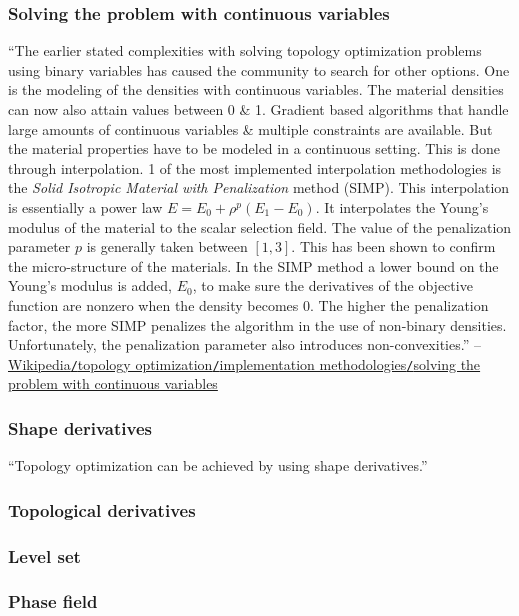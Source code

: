 \documentclass[oneside]{book}
\numberwithin{equation}{section}
\begin{document}
\subsubsection{Solving the problem with continuous variables}
``The earlier stated complexities with solving topology optimization problems using binary variables has caused the community to search for other options. One is the modeling of the densities with continuous variables. The material densities can now also attain values between 0 \& 1. Gradient based algorithms that handle large amounts of continuous variables \& multiple constraints are available. But the material properties have to be modeled in a continuous setting. This is done through interpolation. 1 of the most implemented interpolation methodologies is the \textit{Solid Isotropic Material with Penalization} method (SIMP). This interpolation is essentially a power law $E = E_0 + \rho^p(E_1 - E_0)$. It interpolates the Young's modulus of the material to the scalar selection field. The value of the penalization parameter $p$ is generally taken between $[1,3]$. This has been shown to confirm the micro-structure of the materials. In the SIMP method a lower bound on the Young's modulus is added, $E_0$, to make sure the derivatives of the objective function are nonzero when the density becomes 0. The higher the penalization factor, the more SIMP penalizes the algorithm in the use of non-binary densities. Unfortunately, the penalization parameter also introduces non-convexities.'' -- \href{https://en.wikipedia.org/wiki/Topology_optimization#Solving_the_problem_with_continuous_variables}{Wikipedia\texttt{/}topology optimization\texttt{/}implementation methodologies\texttt{/}solving the problem with continuous variables}

\subsubsection{Shape derivatives}
``Topology optimization can be achieved by using shape derivatives.'' 

\subsubsection{Topological derivatives}

\subsubsection{Level set}

\subsubsection{Phase field}
\end{document}
